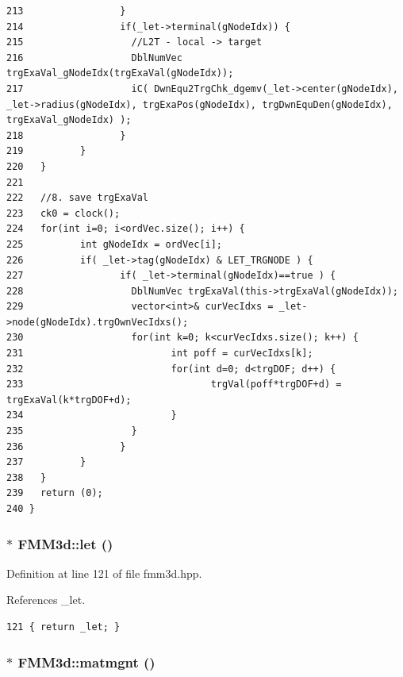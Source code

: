 \begin{verbatim}
213                 }
214                 if(_let->terminal(gNodeIdx)) {
215                   //L2T - local -> target
216                   DblNumVec trgExaVal_gNodeIdx(trgExaVal(gNodeIdx));
217                   iC( DwnEqu2TrgChk_dgemv(_let->center(gNodeIdx), _let->radius(gNodeIdx), trgExaPos(gNodeIdx), trgDwnEquDen(gNodeIdx), trgExaVal_gNodeIdx) );
218                 }
219          }
220   }
221   
222   //8. save trgExaVal
223   ck0 = clock();
224   for(int i=0; i<ordVec.size(); i++) {
225          int gNodeIdx = ordVec[i];
226          if( _let->tag(gNodeIdx) & LET_TRGNODE ) {
227                 if( _let->terminal(gNodeIdx)==true ) {
228                   DblNumVec trgExaVal(this->trgExaVal(gNodeIdx));
229                   vector<int>& curVecIdxs = _let->node(gNodeIdx).trgOwnVecIdxs();
230                   for(int k=0; k<curVecIdxs.size(); k++) {
231                          int poff = curVecIdxs[k];
232                          for(int d=0; d<trgDOF; d++) {
233                                 trgVal(poff*trgDOF+d) = trgExaVal(k*trgDOF+d);
234                          }
235                   }
236                 }
237          }
238   }
239   return (0);
240 }
\end{verbatim}\normalsize 


\subsubsection{$\ast$ FMM3d::let ()\hspace{0.3cm}{\tt  [inline]}}\label{classFMM3d_ab08876abdb0f42b280939bc45a41dad_ab08876abdb0f42b280939bc45a41dad}




Definition at line 121 of file fmm3d.hpp.

References \_\-let.

\footnotesize\begin{verbatim}121 { return _let; }
\end{verbatim}\normalsize 


\subsubsection{$\ast$ FMM3d::matmgnt ()\hspace{0.3cm}{\tt  [inline]}}\label{classFMM3d_eb0e3260b02ea4bd6f7a2303874f53bf_eb0e3260b02ea4bd6f7a2303874f53bf}




